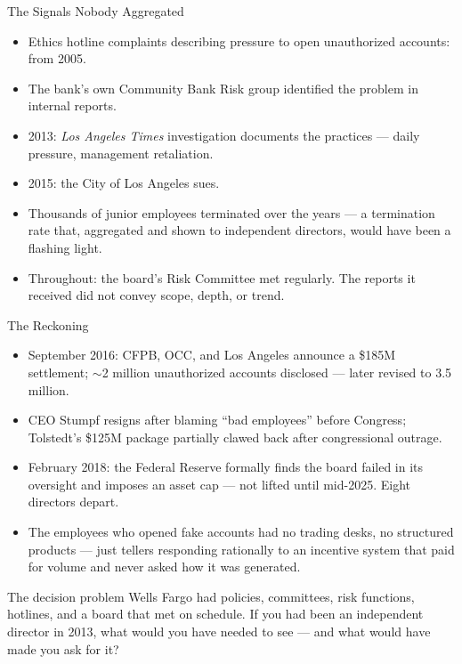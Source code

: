 \documentclass[11pt, aspectratio=169]{beamer}
\begin{document}
\begin{frame}{The Signals Nobody Aggregated}
\begin{itemize}
  \item Ethics hotline complaints describing pressure to open unauthorized accounts: \alert{from 2005}.
  \item The bank's own Community Bank Risk group identified the problem in internal reports.
  \item 2013: \emph{Los Angeles Times} investigation documents the practices --- daily pressure, management retaliation.
  \item 2015: the City of Los Angeles sues.
  \item Thousands of junior employees terminated over the years --- a termination rate that, aggregated and shown to independent directors, would have been a flashing light.
  \item Throughout: the board's Risk Committee \alert{met regularly}. The reports it received did not convey scope, depth, or trend.
\end{itemize}
\end{frame}

\begin{frame}{The Reckoning}
\begin{itemize}
  \item September 2016: CFPB, OCC, and Los Angeles announce a \$185M settlement; $\sim$2 million unauthorized accounts disclosed --- later revised to \alert{3.5 million}.
  \item CEO Stumpf resigns after blaming ``bad employees'' before Congress; Tolstedt's \$125M package partially clawed back after congressional outrage.
  \item February 2018: the Federal Reserve formally finds the \alert{board failed in its oversight} and imposes an \alert{asset cap} --- not lifted until mid-2025. Eight directors depart.
  \item The employees who opened fake accounts had no trading desks, no structured products --- just tellers responding rationally to an incentive system that paid for volume and never asked how it was generated.
\end{itemize}
\medskip
\begin{block}{The decision problem}
Wells Fargo had policies, committees, risk functions, hotlines, and a board that met on schedule. If you had been an independent director in 2013, what would you have needed to see --- and what would have made you ask for it?
\end{block}
\end{frame}
\end{document}
